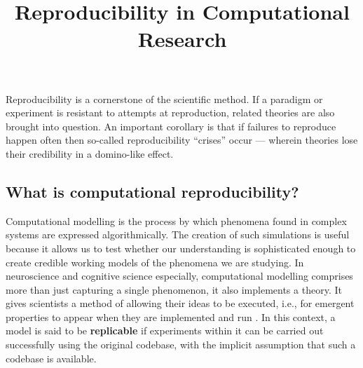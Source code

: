 \documentclass[jou]{apa6}
\title{Reproducibility in Computational Research}
\begin{document}
\maketitle



Reproducibility is a cornerstone of the scientific method.
If a paradigm or experiment is resistant to attempts at reproduction, related theories are also brought into question.
An important corollary is that if failures to reproduce happen often then so-called reproducibility ``crises'' occur --- wherein theories lose their credibility in a domino-like effect.

\subsection*{What is computational reproducibility?}
Computational modelling is the process by which phenomena found in complex systems are expressed algorithmically.
The creation of such simulations is useful because it allows us to test whether our understanding is sophisticated enough to create credible working models of the phenomena we are studying.
In neuroscience and cognitive science especially, computational modelling comprises more than just capturing a single phenomenon, it also  implements a theory.
It gives scientists a method of allowing their ideas to be executed, i.e., for emergent properties to appear when they are implemented and run \cite{mcclelland09}.
In this context, a model is said to be  \textbf{replicable} if experiments within it can be carried out successfully using the original codebase, with the implicit assumption that such a codebase is available.
\end{document}

